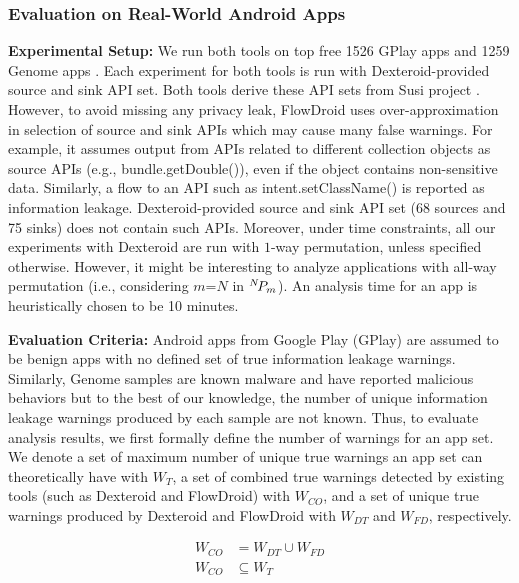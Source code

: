 \documentclass[10pt]{elsarticle}
\begin{document}
\subsubsection{Evaluation on Real-World Android Apps} \label{evalReadWorld}

{\noindent \bf Experimental Setup:} We run both tools on top free 1526 GPlay apps and 1259 Genome apps \cite{dissectingAndroid}. Each experiment for both tools is run with Dexteroid-provided source and sink API set. Both tools derive these API sets from Susi project \cite{Susi}. However, to avoid missing any privacy leak, FlowDroid uses over-approximation in selection of source and sink APIs which may cause many false warnings. For example, it assumes output from APIs related to different collection objects as source APIs (e.g., {\ttfamily bundle.getDouble()}), even if the object contains non-sensitive data. Similarly, a flow to an API such as {\ttfamily intent.setClassName()} is reported as information leakage. Dexteroid-provided source and sink API set (68 sources and 75 sinks) does not contain such APIs. Moreover, under time constraints, all our experiments with Dexteroid are run with $1$-way permutation, unless specified otherwise. However, it might be interesting to analyze applications with all-way permutation (i.e., considering $m$=$N$ in ${{}^{N}\mkern-3muP_{m}}$). An analysis time for an app is heuristically chosen to be 10 minutes. 


{\noindent \bf Evaluation Criteria:} Android apps from Google Play (GPlay) are assumed to be benign apps with no defined set of true information leakage warnings. Similarly, Genome samples are known malware and have reported malicious behaviors \cite{dissectingAndroid} but to the best of our knowledge, the number of unique information leakage warnings produced by each sample are not known. Thus, to evaluate analysis results, we first formally define the number of warnings for an app set. We denote a set of maximum number of unique true warnings an app set can theoretically have with $W_{T}$, a set of combined true warnings detected by existing tools (such as Dexteroid and FlowDroid) with $W_{CO}$, and a set of unique true warnings produced by Dexteroid and FlowDroid with $W_{DT}$ and $W_{FD}$, respectively. 
    
\begin{align}
W_{CO} & =  W_{DT} \cup W_{FD}\label{eq1}\\ 
W_{CO} & \subseteq  W_{T} \label{eq2}
\end{align}
\end{document}
